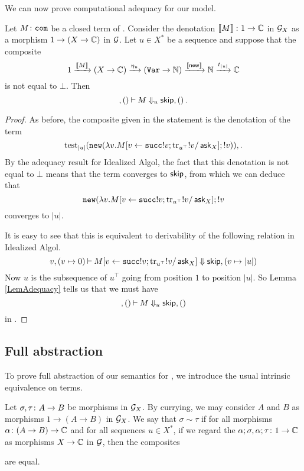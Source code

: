 \documentclass{article}
\begin{document}
We can now prove computational adequacy for our model.

\begin{proposition}
  Let $M\colon {\mathtt{com}}$ be a closed term of \IAX.  
  Consider the denotation $\left\llbracket M\right\rrbracket\colon 1 \to \mathbb{C}$ in $\mathcal G_X$ as a morphism $1 \to (X \to \mathbb{C})$ in $\mathcal G$.  
  Let $u\in X^*$ be a sequence and suppose that the composite
  \[
    1 \xrightarrow{\left\llbracket M\right\rrbracket}
    (X \to \mathbb{C}) \xrightarrow{\eta_u}
    ({\mathtt{Var}} \to \mathbb{N}) \xrightarrow{\left\llbracket\operatorname{{\mathsf{new}}}\right\rrbracket}
    \mathbb{N} \xrightarrow{t_{|u|}}
    \mathbb{C}
    \]
  is not equal to $\bot$.  
  Then
  \[
    ,()\mathbin{\vdash} M\Downarrow_u {\mathsf{skip}},()\,.
    \]
  \label{PropKleisliAdequacy}
\end{proposition}
\begin{proof}
  As before, the composite given in the statement is the denotation of the term
  \[
    \operatorname{test}_{|u|} ({\mathtt{new}} (\lambda v.M[v\gets \operatorname{{\mathtt{succ}}} !v;\operatorname{tr}_{u^\top} !v/\operatorname{{\mathsf{ask}}}_X];!v))\\,.
    \]
  By the adequacy result for Idealized Algol, the fact that this denotation is not equal to $\bot$ means that the term converges to ${\mathsf{skip}}$, from which we can deduce that
  \[
    {\mathtt{new}} (\lambda v.M[v\gets \operatorname{{\mathtt{succ}}} !v;\operatorname{tr}_{u^\top} !v/\operatorname{{\mathsf{ask}}}_X];!v
    \]
  converges to $|u|$.

  It is easy to see that this is equivalent to derivability of the following relation in Idealized Algol.
  \[
    v,(v\mapsto 0) \mathbin{\vdash} M[v\gets \operatorname{{\mathtt{succ}}} !v;\operatorname{tr}_{u^\top} !v/\operatorname{{\mathsf{ask}}}_X] \Downarrow {\mathsf{skip}},(v\mapsto |u|)
    \]
  Now $u$ is the subsequence of $u^\top$ going from position $1$ to position $|u|$.  
  So Lemma \ref{LemAdequacy} tells us that we must have
  \[
    ,()\mathbin{\vdash} M \Downarrow_u {\mathsf{skip}},()
    \]
  in \IAX.
\end{proof}

\subsection{Full abstraction}

To prove full abstraction of our semantics for \IAX, we introduce the usual intrinsic equivalence on terms.

\begin{definition}
  Let $\sigma,\tau\colon A \to B$ be morphisms in $\mathcal G_X$.  
  By currying, we may consider $A$ and $B$ as morphisms $1 \to (A \to B)$ in $\mathcal G_X$.
  We say that $\sigma\sim\tau$ if for all morphisms $\alpha\colon (A \to B) \to \mathbb{C}$ and for all sequences $u\in X^*$, if we regard the $\alpha;\sigma,\alpha;\tau\colon 1 \to \mathbb{C}$ as morphisms $X \to \mathbb{C}$ in $\mathcal G$, then the composites
  are equal.
\end{definition}
\end{document}
